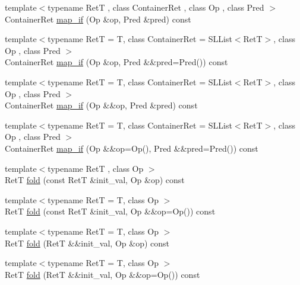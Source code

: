 \begin{DoxyCompactItemize}
\item 
{\footnotesize template$<$typename RetT , class Container\+Ret , class Op , class Pred $>$ }\\Container\+Ret \hyperlink{class_designar_1_1_container_algorithms_a9209d9ddf0b4dd85301735c99bcdb171}{map\+\_\+if} (Op \&op, Pred \&pred) const
\item 
{\footnotesize template$<$typename RetT  = T, class Container\+Ret  = S\+L\+List$<$\+Ret\+T$>$, class Op , class Pred $>$ }\\Container\+Ret \hyperlink{class_designar_1_1_container_algorithms_a06b2fbf8f85675b8c69be00399710031}{map\+\_\+if} (Op \&op, Pred \&\&pred=Pred()) const
\item 
{\footnotesize template$<$typename RetT  = T, class Container\+Ret  = S\+L\+List$<$\+Ret\+T$>$, class Op , class Pred $>$ }\\Container\+Ret \hyperlink{class_designar_1_1_container_algorithms_a582b067d39658825339075873f20aee6}{map\+\_\+if} (Op \&\&op, Pred \&pred) const
\item 
{\footnotesize template$<$typename RetT  = T, class Container\+Ret  = S\+L\+List$<$\+Ret\+T$>$, class Op , class Pred $>$ }\\Container\+Ret \hyperlink{class_designar_1_1_container_algorithms_a23ffa9f0af79826db5a8dc04837f9617}{map\+\_\+if} (Op \&\&op=Op(), Pred \&\&pred=Pred()) const
\item 
{\footnotesize template$<$typename RetT , class Op $>$ }\\RetT \hyperlink{class_designar_1_1_container_algorithms_a1b6d1cb2289bf894a2af994e9c6e1d03}{fold} (const RetT \&init\+\_\+val, Op \&op) const
\item 
{\footnotesize template$<$typename RetT  = T, class Op $>$ }\\RetT \hyperlink{class_designar_1_1_container_algorithms_a410f880dab4f206d3d99b31b0a67637d}{fold} (const RetT \&init\+\_\+val, Op \&\&op=Op()) const
\item 
{\footnotesize template$<$typename RetT  = T, class Op $>$ }\\RetT \hyperlink{class_designar_1_1_container_algorithms_a148e3417520a3253663bd2554cad6c67}{fold} (RetT \&\&init\+\_\+val, Op \&op) const
\item 
{\footnotesize template$<$typename RetT  = T, class Op $>$ }\\RetT \hyperlink{class_designar_1_1_container_algorithms_a9ff56a438586390aaf72aa2fda0f86e7}{fold} (RetT \&\&init\+\_\+val, Op \&\&op=Op()) const
\item 

\end{DoxyCompactItemize}
